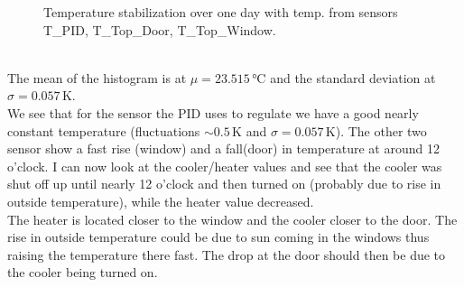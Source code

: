 \documentclass[12pt]{scrartcl}
\begin{document}
\begin{figure}[h!]
          \caption{Temperature stabilization over one day with temp. from
          sensors T\_PID, T\_Top\_Door, T\_Top\_Window.}
          \label{fig11}
        \end{figure} \\
        The mean of the histogram is at $\mu = 23.515\,\text{°C}$ and the standard
        deviation at $\sigma = 0.057\,\text{K}$. \\
        We see that for the sensor the PID uses to regulate we have a good
        nearly constant temperature (fluctuations $\sim 0.5\,\text{K}$ and
        $\sigma = 0.057\,\text{K}$). The other two sensor show a fast rise
        (window) and a fall(door) in temperature at around 12 o'clock. I can now
        look at the cooler/heater values and see that the cooler was shut off up
        until nearly 12 o'clock and then turned on (probably due to rise in
        outside temperature), while the heater value decreased. \\
        The heater is located closer to the window and the cooler closer to the
        door.
        The rise in outside temperature could be due to sun coming in the
        windows thus raising the temperature there fast. The drop at the door
        should then be due to the cooler being turned on.
      \newpage
\end{document}
